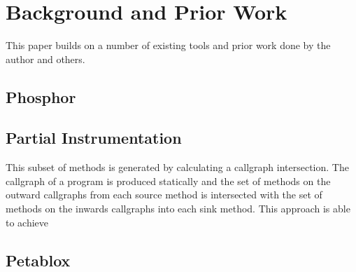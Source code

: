 \chapter{Background and Prior Work}
This paper builds on a number of existing tools and prior work done by the author and others.
\section{Phosphor}
\section{Partial Instrumentation}
This subset of methods is generated by calculating a callgraph intersection. The callgraph of a program is produced statically and the set of methods on the outward callgraphs from each source method is intersected with the set of methods on the inwards callgraphs into each sink method. This approach is able to achieve 
\section{Petablox}
